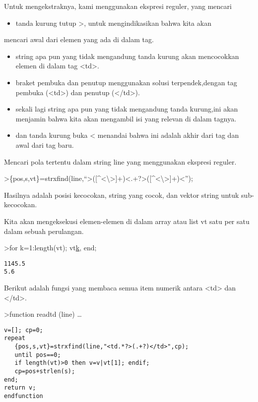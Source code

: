 \documentclass[
]{book}
\providecommand{\tightlist}{%
  \setlength{\itemsep}{0pt}\setlength{\parskip}{0pt}}
\begin{document}
Untuk mengekstraknya, kami menggunakan ekspresi reguler, yang mencari

\begin{itemize}
\tightlist
\item
  tanda kurung tutup \textgreater, untuk mengindikasikan bahwa kita akan
\end{itemize}

mencari awal dari elemen yang ada di dalam tag.

\begin{itemize}
\item
  string apa pun yang tidak mengandung tanda kurung akan mencocokkan elemen di dalam tag \textless td\textgreater.
\item
  braket pembuka dan penutup menggunakan solusi terpendek,dengan tag pembuka (\textless td\textgreater) dan penutup (\textless/td\textgreater).
\item
  sekali lagi string apa pun yang tidak mengandung tanda kurung,ini akan menjamin bahwa kita akan mengambil isi yang relevan di dalam tagnya.
\item
  dan tanda kurung buka \textless{} menandai bahwa ini adalah akhir dari tag dan awal dari tag baru.
\end{itemize}

Mencari pola tertentu dalam string line yang menggunakan ekspresi reguler.

\textgreater\{pos,s,vt\}=strxfind(line,``\textgreater({[}\^{}\textless\textbackslash\textgreater{]}+)\textless.+?\textgreater({[}\^{}\textless\textbackslash\textgreater{]}+)\textless{}'');

Hasilnya adalah posisi kecocokan, string yang cocok, dan vektor string untuk sub-kecocokan.

Kita akan mengeksekusi elemen-elemen di dalam array atau list vt satu per satu dalam sebuah perulangan.

\textgreater for k=1:length(vt); vt\href{}{k}, end;

\begin{verbatim}
1145.5
5.6
\end{verbatim}

Berikut adalah fungsi yang membaca semua item numerik antara \textless td\textgreater{} dan \textless/td\textgreater.

\textgreater function readtd (line) \ldots{}

\begin{verbatim}
v=[]; cp=0;
repeat
   {pos,s,vt}=strxfind(line,"<td.*?>(.+?)</td>",cp);
   until pos==0;
   if length(vt)>0 then v=v|vt[1]; endif;
   cp=pos+strlen(s);
end;
return v;
endfunction
\end{verbatim}
\end{document}
